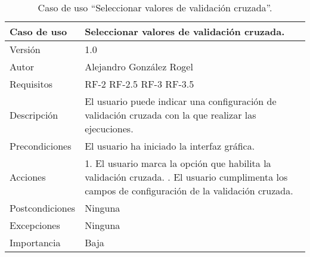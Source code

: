  
     \begin{table}
  \begin{center}
   \begin{tabular}{|>{} L{3cm} | L{9cm} |}
    \hline
    Caso de uso & Seleccionar valores de validación cruzada.\\
    \hline
    Versión & 1.0 \\
    \hline
    Autor & Alejandro González Rogel \\
    \hline
    Requisitos & RF-2\newline
    				 RF-2.5\newline
    				 RF-3\newline
    				 RF-3.5 \\
    \hline
    Descripción & El usuario puede indicar una configuración de validación cruzada con la que realizar las ejecuciones. \\
    \hline
    Precondiciones & El usuario ha iniciado la interfaz gráfica.\\
    \hline
    		Acciones & 1. El usuario marca la opción que habilita la validación cruzada. . El usuario cumplimenta los campos de configuración de la validación cruzada.\\
    \hline
    Postcondiciones & Ninguna\\
    \hline
    Excepciones & Ninguna \\
    \hline
    Importancia & Baja \\
    \hline
   \end{tabular}
   \caption{Caso de uso ``Seleccionar valores de validación cruzada''.}
   \label{tabla:casoUso9}
  \end{center}
 \end{table}
 
 
 
